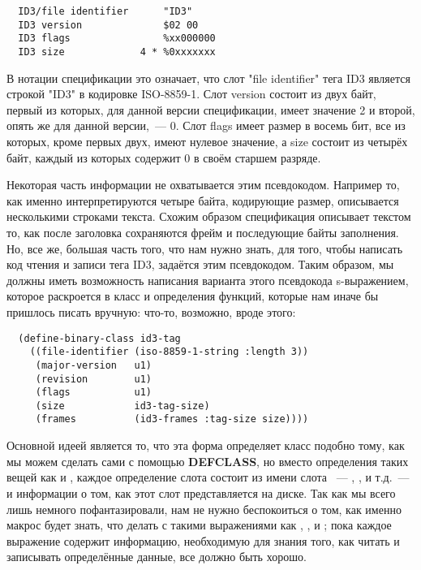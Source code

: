 \begin{verbatim}
  ID3/file identifier      "ID3"
  ID3 version              $02 00
  ID3 flags                %xx000000
  ID3 size             4 * %0xxxxxxx
\end{verbatim}

В нотации спецификации это означает, что слот "file identifier" тега ID3 является строкой
"ID3" в кодировке ISO-8859-1. Слот version состоит из двух байт, первый из которых, для
данной версии спецификации, имеет значение 2 и второй, опять же для данной версии,~---
0. Слот flags имеет размер в восемь бит, все из которых, кроме первых двух, имеют нулевое
значение, а size состоит из четырёх байт, каждый из которых содержит 0 в своём старшем
разряде.

Некоторая часть информации не охватывается этим псевдокодом. Например то, как именно
интерпретируются четыре байта, кодирующие размер, описывается несколькими строками
текста. Схожим образом спецификация описывает текстом то, как после заголовка сохраняются
фрейм и последующие байты заполнения. Но, все же, большая часть того, что нам нужно знать,
для того, чтобы написать код чтения и записи тега ID3, задаётся этим псевдокодом. Таким
образом, мы должны иметь возможность написания варианта этого псевдокода s-выражением,
которое раскроется в класс и определения функций, которые нам иначе бы пришлось писать
вручную: что-то, возможно, вроде этого:

\begin{lstlisting}
  (define-binary-class id3-tag
    ((file-identifier (iso-8859-1-string :length 3))
     (major-version   u1)
     (revision        u1)
     (flags           u1)
     (size            id3-tag-size)
     (frames          (id3-frames :tag-size size))))
\end{lstlisting}

Основной идеей является то, что эта форма определяет класс  подобно тому,
как мы можем сделать сами с помощью \textbf{DEFCLASS}, но вместо определения таких вещей
как  и , каждое определение слота состоит из имени слота
~--- , , и т.д.~--- и информации о том, как этот
слот представляется на диске. Так как мы всего лишь немного пофантазировали, нам не нужно
беспокоиться о том, как именно макрос  будет знать, что делать с
такими выражениями как , ,
 и ; пока каждое выражение содержит
информацию, необходимую для знания того, как читать и записывать определённые данные, все
должно быть хорошо.

